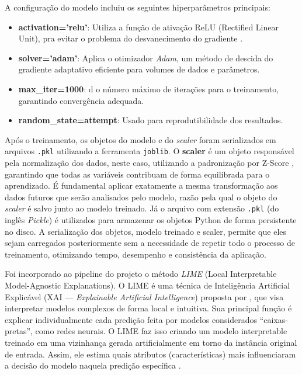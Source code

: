 A configuração do modelo incluiu os seguintes hiperparâmetros principais:
\begin{itemize}
  \item \textbf{activation='relu'}: Utiliza a função de ativação ReLU (Rectified Linear Unit), pra evitar o problema do desvanecimento do gradiente \cite{geron2017}.
  \item \textbf{solver='adam'}: Aplica o otimizador \textit{Adam}, um método de descida do gradiente adaptativo eficiente para volumes de dados e parâmetros.
  \item \textbf{max\_iter=1000}: d o número máximo de iterações para o treinamento, garantindo convergência adequada.
  \item \textbf{random\_state=attempt}: Usado para reprodutibilidade dos resultados.
\end{itemize}

Após o treinamento, os objetos do modelo e do \textit{scaler} foram serializados em arquivos \texttt{.pkl} utilizando a ferramenta \texttt{joblib}. O \textbf{scaler} é um objeto responsável pela normalização dos dados, neste caso, utilizando a padronização por Z-Score \cite{geron2017}, garantindo que todas as variáveis contribuam de forma equilibrada para o aprendizado. É fundamental aplicar exatamente a mesma transformação aos dados futuros que serão analisados pelo modelo, razão pela qual o objeto do \textit{scaler} é salvo junto ao modelo treinado. Já o arquivo com extensão \texttt{.pkl} (do inglês \textit{Pickle}) é utilizados para armazenar os objetos Python de forma persistente no disco. A serialização dos objetos, modelo treinado e scaler, permite que eles sejam carregados posteriormente sem a necessidade de repetir todo o processo de treinamento, otimizando tempo, desempenho e consistência da aplicação.

Foi incorporado ao pipeline do projeto o método \textit{LIME} (Local Interpretable Model-Agnostic Explanations). O LIME é uma técnica de Inteligência Artificial Explicável (XAI — \textit{Explainable Artificial Intelligence}) proposta por , que visa interpretar modelos complexos de forma local e intuitiva. Sua principal função é explicar individualmente cada predição feita por modelos considerados “caixas-pretas”, como redes neurais. O LIME faz isso criando um modelo interpretable treinado em uma vizinhança gerada artificialmente em torno da instância original de entrada. Assim, ele estima quais atributos (características) mais influenciaram a decisão do modelo naquela predição específica \cite{ribeiro2016}. 

